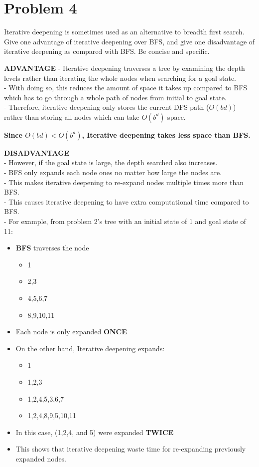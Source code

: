 \documentclass{article}
\begin{document}
\section*{Problem 4} Iterative deepening is sometimes used as an alternative to breadth first search. Give one advantage
of iterative deepening over BFS, and give one disadvantage of iterative deepening as compared with BFS. Be concise and
specific.
\medskip

\textbf{ADVANTAGE} 
\newline
- Iterative deepening traverses a tree by examining the depth levels rather than iterating the whole nodes when searching for a goal state.\\
- With doing so, this reduces the amount of space it takes up compared to BFS which has to go through a whole path of nodes from initial to goal state.\\
- Therefore, iterative deepening only stores the current DFS path ($O(bd)$) rather than storing all nodes which can take $O(b^d)$ space.\\
\begin{center}
   \textbf{Since $O(bd) < O(b^d)$, Iterative deepening takes less space than BFS.}
\end{center}

\textbf{DISADVANTAGE}\\
- However, if the goal state is large, the depth searched also increases.\\
- BFS only expands each node ones no matter how large the nodes are.\\
- This makes iterative deepening to re-expand nodes multiple times more than BFS.\\
- This causes iterative deepening to have extra computational time compared to BFS.\\
- For example, from problem 2's tree with an initial state of 1 and goal state of 11:
\begin{itemize}
   \item \textbf{BFS} traverses the node 
   \begin{itemize}
      \item 1
      \item 2,3
      \item 4,5,6,7
      \item 8,9,10,11
   \end{itemize}
   \item Each node is only expanded \textbf{ONCE}
   \item On the other hand, Iterative deepening expands: 
   \begin{itemize}
      \item 1
      \item 1,2,3
      \item 1,2,4,5,3,6,7
      \item 1,2,4,8,9,5,10,11
   \end{itemize}
   \item In this case, (1,2,4, and 5) were expanded \textbf{TWICE}
   \item This shows that iterative deepening waste time for re-expanding previously expanded nodes.
\end{itemize}
\end{document}
